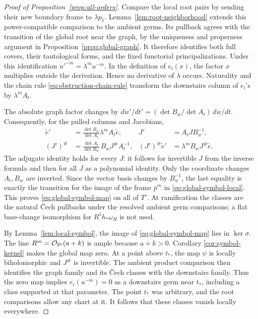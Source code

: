 \begin{proof}[Proof of Proposition~\ref{prop:all-orders}]
Compare the local root pairs by sending their new boundary frame to
\(\lambda p_1\).  Lemma~\ref{lem:root-neighborhood} extends this
power-compatible comparison to the ambient germs.  Its pullback agrees
with the transition of the global root near the graph, by the uniqueness
and properness argument in Proposition~\ref{prop:global-graph}.  It
therefore identifies both full covers, their tautological forms, and
the fixed functorial principalizations.  Under this identification
\(u'^{-m}=\lambda^m u^{-m}\).  In the definition of \(e_i(x)\), the
factor \(x\) multiplies outside the derivation.  Hence no derivative of
\(\lambda\) occurs.  Naturality and the chain rule
\eqref{eq:obstruction-chain-rule} transform the downstairs column of
\(e_i\)'s by \(\lambda^m A_t\).

The absolute graph factor changes by
\(dw'/dt'=(\det B_w/\det A_t)\,dw/dt\).  Consequently, for the pulled
columns and Jacobians,
\begin{align}
 \widetilde e'&=\frac{\det B_w}{\det A_t}\lambda^m A_t\widetilde e,
 &J'&=A_tJB_w^{-1},\label{eq:symbol-transition-one}\\
 (J')^\#&=\frac{\det A_t}{\det B_w}\,B_wJ^\#A_t^{-1},
 &(J')^\#\widetilde e'&=\lambda^m B_wJ^\#\widetilde e.
 \label{eq:symbol-transition-two}
\end{align}
The adjugate identity holds for every \(J\): it follows for invertible
\(J\) from the inverse formula and then for all \(J\) as a polynomial
identity.  Only the coordinate changes \(A_t,B_w\) are inverted.
Since the vector basis changes by \(B_w^{-1}\), the last equality is
exactly the transition for the image of the frame \(\bar p^m\) in
\eqref{eq:global-symbol-local}.  This proves \eqref{eq:global-symbol-map}
on all of \(T'\).  At ramification the classes are the natural \v Cech
pullbacks under the resolved ambient germ comparisons; a flat base-change
isomorphism for \(R^1h_*\omega_H\) is not used.

By Lemma~\ref{lem:local-symbol}, the image of
\eqref{eq:global-symbol-map} lies in \(\ker\sigma\).  The line
\(R^m=\mathcal O_{\mathbb P^b}(a+k)\) is ample because \(a+k>0\).  Corollary
\ref{cor:symbol-kernel} makes the global map zero.  At a point above
\(t_*\), the map \(\psi\) is locally biholomorphic and \(J^\#\) is
invertible.  The ambient product comparison then identifies the graph
family and its \v Cech classes with the downstairs family.  Thus the
zero map implies \(e_i(u^{-m})=0\) as a downstairs germ near \(t_*\),
including a class supported at that parameter.  The point \(t_*\) was
arbitrary, and the root comparisons allow any chart at it.  It follows
that these classes vanish locally everywhere.


\end{proof}
